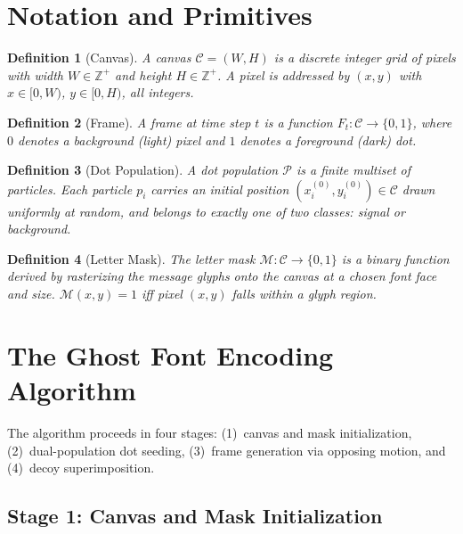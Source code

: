 \documentclass[12pt,a4paper]{article}
\newtheorem{definition}{Definition}
\begin{document}
\section{Notation and Primitives}

\begin{definition}[Canvas]
A \emph{canvas} $\mathcal{C} = (W, H)$ is a discrete integer grid of pixels
with width $W \in \mathbb{Z}^+$ and height $H \in \mathbb{Z}^+$.  A pixel is
addressed by $(x, y)$ with $x \in [0, W)$, $y \in [0, H)$, all integers.
\end{definition}

\begin{definition}[Frame]
A \emph{frame} at time step $t$ is a function
$F_t : \mathcal{C} \to \{0, 1\}$, where $0$ denotes a background (light)
pixel and $1$ denotes a foreground (dark) dot.
\end{definition}

\begin{definition}[Dot Population]
A \emph{dot population} $\mathcal{P}$ is a finite multiset of particles.
Each particle $p_i$ carries an initial position
$(x_i^{(0)}, y_i^{(0)}) \in \mathcal{C}$ drawn uniformly at random, and
belongs to exactly one of two classes: \emph{signal} or \emph{background}.
\end{definition}

\begin{definition}[Letter Mask]
The \emph{letter mask} $\mathcal{M} : \mathcal{C} \to \{0, 1\}$ is a binary
function derived by rasterizing the message glyphs onto the canvas at a
chosen font face and size.  $\mathcal{M}(x, y) = 1$ iff pixel $(x, y)$ falls
within a glyph region.
\end{definition}

\section{The Ghost Font Encoding Algorithm}

The algorithm proceeds in four stages: (1)~canvas and mask initialization,
(2)~dual-population dot seeding, (3)~frame generation via opposing motion,
and (4)~decoy superimposition.

\subsection{Stage 1: Canvas and Mask Initialization}
\end{document}
